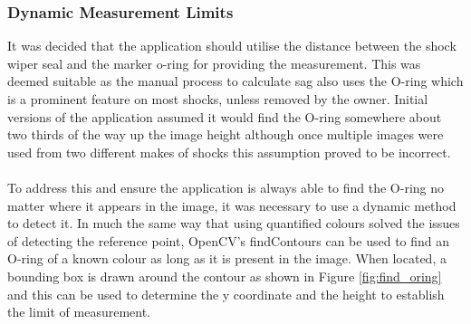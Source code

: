 		\subsubsection{Dynamic Measurement Limits}
			It was decided that the application should utilise the distance between the shock wiper seal and the marker o-ring for providing the measurement. This was deemed suitable as the manual process to calculate sag also uses the O-ring which is a prominent feature on most shocks, unless removed by the owner. Initial versions of the application assumed it would find the O-ring somewhere about two thirds of the way up the image height although once multiple images were used from two different makes of shocks this assumption proved to be incorrect.
			\\\\
			To address this and ensure the application is always able to find the O-ring no matter where it appears in the image, it was necessary to use a dynamic method to detect it. In much the same way that using quantified colours solved the issues of detecting the reference point, OpenCV’s findContours can be used to find an O-ring of a known colour as long as it is present in the image. When located, a bounding box is drawn around the contour as shown in Figure \ref{fig:find_oring} and this can be used to determine  the y coordinate and the height to establish the limit of measurement.

